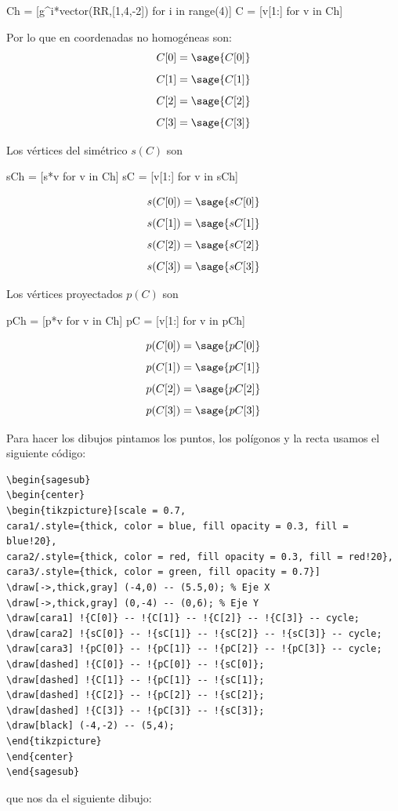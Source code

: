 \documentclass{amsart}
\begin{document}
\begin{enumerate}
\begin{sageblock}
Ch = [g^i*vector(RR,[1,4,-2]) for i in range(4)]
C = [v[1:] for v in Ch]
\end{sageblock}
Por lo que en coordenadas no homogéneas son:
\[C[0]=\sage{C[0]}\]
\[C[1]=\sage{C[1]}\]
\[C[2]=\sage{C[2]}\]
\[C[3]=\sage{C[3]}\]

Los vértices del simétrico $s(C)$ son 

\begin{sageblock}
sCh = [s*v for v in Ch]
sC = [v[1:] for v in sCh]
\end{sageblock}

\[s(C[0])=\sage{sC[0]}\]
\[s(C[1])=\sage{sC[1]}\]
\[s(C[2])=\sage{sC[2]}\]
\[s(C[3])=\sage{sC[3]}\]

Los vértices proyectados $p(C)$ son 

\begin{sageblock}
pCh = [p*v for v in Ch]
pC = [v[1:] for v in pCh]
\end{sageblock}

\[p(C[0])=\sage{pC[0]}\]
\[p(C[1])=\sage{pC[1]}\]
\[p(C[2])=\sage{pC[2]}\]
\[p(C[3])=\sage{pC[3]}\]

Para hacer los dibujos pintamos los puntos, los polígonos y la recta usamos el siguiente código:
\begin{verbatim}
\begin{sagesub}
\begin{center}
\begin{tikzpicture}[scale = 0.7,
cara1/.style={thick, color = blue, fill opacity = 0.3, fill = blue!20},
cara2/.style={thick, color = red, fill opacity = 0.3, fill = red!20},
cara3/.style={thick, color = green, fill opacity = 0.7}]
\draw[->,thick,gray] (-4,0) -- (5.5,0); % Eje X
\draw[->,thick,gray] (0,-4) -- (0,6); % Eje Y
\draw[cara1] !{C[0]} -- !{C[1]} -- !{C[2]} -- !{C[3]} -- cycle;
\draw[cara2] !{sC[0]} -- !{sC[1]} -- !{sC[2]} -- !{sC[3]} -- cycle;
\draw[cara3] !{pC[0]} -- !{pC[1]} -- !{pC[2]} -- !{pC[3]} -- cycle;
\draw[dashed] !{C[0]} -- !{pC[0]} -- !{sC[0]};
\draw[dashed] !{C[1]} -- !{pC[1]} -- !{sC[1]};
\draw[dashed] !{C[2]} -- !{pC[2]} -- !{sC[2]};
\draw[dashed] !{C[3]} -- !{pC[3]} -- !{sC[3]};
\draw[black] (-4,-2) -- (5,4);
\end{tikzpicture}
\end{center}
\end{sagesub}
\end{verbatim}
que nos da el siguiente dibujo:



\end{enumerate}
\end{document}
